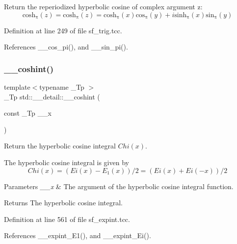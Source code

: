 Return the reperiodized hyperbolic cosine of complex argument z\+: \[ \mathrm{cosh_\pi}(z) = \mathrm{cosh_\pi}(z) = \mathrm{cosh_\pi}(x) \mathrm{cos_\pi}(y) + i \mathrm{sinh_\pi}(x) \mathrm{sin_\pi}(y) \] 

Definition at line 249 of file sf\+\_\+trig.\+tcc.



References \+\_\+\+\_\+cos\+\_\+pi(), and \+\_\+\+\_\+sin\+\_\+pi().

\mbox{\label{namespacestd_1_1____detail_ad48a89a591f7b58a047f072e6e383663}} 
\subsubsection{\texorpdfstring{\+\_\+\+\_\+coshint()}{\_\_coshint()}}
{\footnotesize\ttfamily template$<$typename \+\_\+\+Tp $>$ \\
\+\_\+\+Tp std\+::\+\_\+\+\_\+detail\+::\+\_\+\+\_\+coshint (\begin{DoxyParamCaption}\item[{const \+\_\+\+Tp}]{\+\_\+\+\_\+x }\end{DoxyParamCaption})}



Return the hyperbolic cosine integral $ Chi(x) $. 

The hyperbolic cosine integral is given by \[ Chi(x) = (Ei(x) - E_1(x))/ 2 = (Ei(x) + Ei(-x))/2 \]


\begin{DoxyParams}{Parameters}
{\em \+\_\+\+\_\+x} & The argument of the hyperbolic cosine integral function. \\
\hline
\end{DoxyParams}
\begin{DoxyReturn}{Returns}
The hyperbolic cosine integral. 
\end{DoxyReturn}


Definition at line 561 of file sf\+\_\+expint.\+tcc.



References \+\_\+\+\_\+expint\+\_\+\+E1(), and \+\_\+\+\_\+expint\+\_\+\+Ei().

\mbox{\label{namespacestd_1_1____detail_a0737f268d024ed5d66d3e926239a5c49}} 
